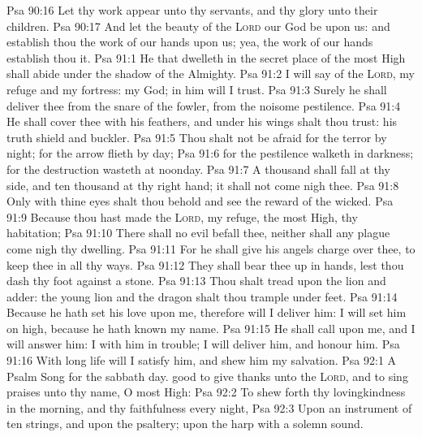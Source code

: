 \vs Psa 90:16 Let thy work appear unto thy servants, and thy glory unto their children.
\vs Psa 90:17 And let the beauty of the \textsc{Lord} our God be upon us: and establish thou the work of our hands upon us; yea, the work of our hands establish thou it.
\vs Psa 91:1 He that dwelleth in the secret place of the most High shall abide under the shadow of the Almighty.
\vs Psa 91:2 I will say of the \textsc{Lord},  my refuge and my fortress: my God; in him will I trust.
\vs Psa 91:3 Surely he shall deliver thee from the snare of the fowler,  from the noisome pestilence.
\vs Psa 91:4 He shall cover thee with his feathers, and under his wings shalt thou trust: his truth  shield and buckler.
\vs Psa 91:5 Thou shalt not be afraid for the terror by night;  for the arrow  flieth by day;
\vs Psa 91:6  for the pestilence  walketh in darkness;  for the destruction  wasteth at noonday.
\vs Psa 91:7 A thousand shall fall at thy side, and ten thousand at thy right hand;  it shall not come nigh thee.
\vs Psa 91:8 Only with thine eyes shalt thou behold and see the reward of the wicked.
\vs Psa 91:9 Because thou hast made the \textsc{Lord},  my refuge,  the most High, thy habitation;
\vs Psa 91:10 There shall no evil befall thee, neither shall any plague come nigh thy dwelling.
\vs Psa 91:11 For he shall give his angels charge over thee, to keep thee in all thy ways.
\vs Psa 91:12 They shall bear thee up in  hands, lest thou dash thy foot against a stone.
\vs Psa 91:13 Thou shalt tread upon the lion and adder: the young lion and the dragon shalt thou trample under feet.
\vs Psa 91:14 Because he hath set his love upon me, therefore will I deliver him: I will set him on high, because he hath known my name.
\vs Psa 91:15 He shall call upon me, and I will answer him: I  with him in trouble; I will deliver him, and honour him.
\vs Psa 91:16 With long life will I satisfy him, and shew him my salvation.
\vs Psa 92:1 A Psalm  Song for the sabbath day.  good  to give thanks unto the \textsc{Lord}, and to sing praises unto thy name, O most High:
\vs Psa 92:2 To shew forth thy lovingkindness in the morning, and thy faithfulness every night,
\vs Psa 92:3 Upon an instrument of ten strings, and upon the psaltery; upon the harp with a solemn sound.
